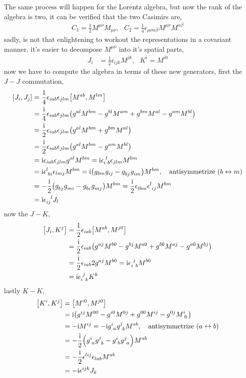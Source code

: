The same process will happen for the Lorentz algebra, but now the rank of the algebra is two, it can be verified that the two Casimirs are, 
\begin{align}
    C_1 = \frac12 M^{\mu\nu}M_{\mu\nu},\ \ \ C_2 = \frac14 \epsilon_{\mu\nu\alpha\beta}M^{\mu\nu}M^{\alpha\beta}
\end{align}
sadly, is not that enlightening to workout the representations in a covariant manner, it's easier to decompose $M^{\mu\nu}$ into it's spatial parts,
\begin{align}
    J_i &=\frac12\epsilon_{ijk}M^{jk},\ \ \ K^i= M^{i0}
\end{align}
now we have to compute the algebra in terms of these new generators, first the $J-J$ commutation,
\begin{align}
    \comm{J_i}{J_j}&=\frac14\epsilon_{iab}\epsilon_{jlm}\comm{M^{ab}}{M^{lm}}\\
    &=\frac\im 4\epsilon_{iab}\epsilon_{jlm}\qty(g^{al}M^{bm}-g^{bl}M^{am}+g^{bm}M^{al}-g^{am}M^{bl})\\
    &=\frac\im 2\epsilon_{iab}\epsilon_{jlm}\qty(g^{al}M^{bm}+g^{bm}M^{al})\\
    &=\frac\im 2\epsilon_{iab}\epsilon_{jlm}\qty(g^{al}M^{bm}-g^{am}M^{bl})\\
    &=\im\epsilon_{iab}\epsilon_{jlm}g^{al}M^{bm}=\im\tensor{\epsilon}{_i^l_b}\epsilon_{jlm}M^{bm}\\
    &=\im\tensor{\epsilon}{^l_b_i}\epsilon_{lmj}M^{bm}=\im\qty(g_{bm}g_{ij}-\tensor{g}{_b_j}\tensor{g}{_i_m})M^{bm},\ \ \ \textnormal{antisymmetrize }(b\leftrightarrow m)\\
    &=-\frac\im2\qty(\tensor{g}{_b_j}\tensor{g}{_m_i}-\tensor{g}{_b_i}\tensor{g}{_m_j})M^{bm}=\frac\im2\tensor{\epsilon}{_l_b_m}\tensor{\epsilon}{^l_i_j}M^{bm}\\
    &=\im\tensor{\epsilon}{_i_j^l}J_l
\end{align}
now the $J-K$,
\begin{align}
    \comm{J_i}{K^j}&=\frac12\epsilon_{iab}\comm{M^{ab}}{M^{j0}}\\
    &=\frac\im2\epsilon_{iab}\qty(\tensor{g}{^a^j}M^{b0}-\tensor{g}{^b^j}M^{a0}+g^{b0}\tensor{M}{^a^j}-g^{a0}\tensor{M}{^b^j})\\
    &=\frac\im2\epsilon_{iab}2\tensor{g}{^a^j}M^{b0}=\im\tensor{\epsilon}{_i^j_b}M^{b0}\\
    &=\im\tensor{\epsilon}{_i^j_k}K^k
\end{align}
lastly $K-K$,
\begin{align}
    \comm{K^i}{K^j}&=\comm{M^{i0}}{M^{j0}}\\
    &=\im\qty(g^{ij}M^{00}-\tensor{g}{^i^0}\tensor{M}{^0^j}+\tensor{g}{^0^0}M^{ij}-\tensor{g}{^0^j}\tensor{M}{^i_0})\\
    &=-\im M^{ij}=-\im \tensor{g}{^i_a}\tensor{g}{^j_b}M^{ab},\ \ \ \textnormal{antisymmetrize }(a\leftrightarrow b)\\
    &=-\frac\im2\qty(\tensor{g}{^i_a}\tensor{g}{^j_b}-\tensor{g}{^i_b}\tensor{g}{^j_a})M^{ab}\\
    &=-\frac\im2\tensor{\epsilon}{^l^i^j}\epsilon_{lab}M^{ab}\\
    &=-\im\epsilon^{ijk}J_{k}
\end{align}

